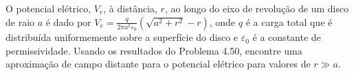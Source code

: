 O potencial elétrico, $V_e$, à distância, $r$, ao longo do eixo de revolução de um disco de raio $a$ é dado por $V_e = \frac{q}{2\pi a^2 \varepsilon_0}(\sqrt{a^2 + r^2} - r)$, onde $q$ é a carga total que é distribuída uniformemente sobre a superfície do disco e $\varepsilon_0$ é a constante de permissividade. Usando os resultados do Problema 4.50, encontre uma aproximação de campo distante para o potencial elétrico para valores de $r \gg a$.

